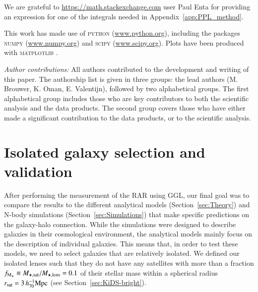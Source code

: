 \documentclass{aa}
\newcommand{\hMpc}{\,h_{70}^{-1}{\rm{Mpc}} }
\newcommand{\un}[1]{_{\rm #1}}
\begin{document}
We are grateful to \url{https://math.stackexchange.com} user Paul Enta for providing an expression for one of the integrals needed in Appendix~\ref{app:PPL_method}.

This work has made use of {\scshape python} (\url{www.python.org}), including the packages {\scshape numpy} (\url{www.numpy.org}) and {\scshape scipy} (\url{www.scipy.org}). Plots have been produced with {\scshape matplotlib} \cite[]{hunter2007}.

\emph{Author contributions:} All authors contributed to the development and writing of this paper. The authorship list is given in three groups: the lead authors (M. Brouwer, K. Oman, E. Valentijn), followed by two alphabetical groups. The first alphabetical group includes those who are key contributors to both the scientific analysis and the data products. The second group covers those who have either made a significant contribution to the data products, or to the scientific analysis.









\appendix

\section{Isolated galaxy selection and validation}
\label{app:Isolation}


After performing the measurement of the RAR using GGL, our final goal was to compare the results to the different analytical models (Section~\ref{sec:Theory}) and N-body simulations (Section~\ref{sec:Simulations}) that make specific predictions on the galaxy-halo connection. While the simulations were designed to describe galaxies in their cosmological environment, the analytical models mainly focus on the description of individual galaxies. This means that, in order to test these models, we need to select galaxies that are relatively isolated. We defined our isolated lenses such that they do not have any satellites with more than a fraction $f\un{M_\star} \equiv M\un{\star,sat}/M\un{\star,lens} = 0.1$ of their stellar mass within a spherical radius $r\un{sat}=3\hMpc$ (see Section~\ref{sec:KiDS-bright}).
\end{document}
